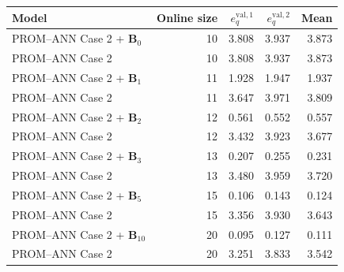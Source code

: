 \begin{tabular}{lr|rrr}
\toprule
Model & Online size & $e_q^{\mathrm{val},1}$ & $e_q^{\mathrm{val},2}$ & Mean \\
\midrule
PROM--ANN Case 2 + $\mathbf B_{0}$ & 10 & 3.808 & 3.937 & 3.873 \\
PROM--ANN Case 2 & 10 & 3.808 & 3.937 & 3.873 \\
\addlinespace[0.2em]
PROM--ANN Case 2 + $\mathbf B_{1}$ & 11 & 1.928 & 1.947 & 1.937 \\
PROM--ANN Case 2 & 11 & 3.647 & 3.971 & 3.809 \\
\addlinespace[0.2em]
PROM--ANN Case 2 + $\mathbf B_{2}$ & 12 & 0.561 & 0.552 & 0.557 \\
PROM--ANN Case 2 & 12 & 3.432 & 3.923 & 3.677 \\
\addlinespace[0.2em]
PROM--ANN Case 2 + $\mathbf B_{3}$ & 13 & 0.207 & 0.255 & 0.231 \\
PROM--ANN Case 2 & 13 & 3.480 & 3.959 & 3.720 \\
\addlinespace[0.2em]
PROM--ANN Case 2 + $\mathbf B_{5}$ & 15 & 0.106 & 0.143 & 0.124 \\
PROM--ANN Case 2 & 15 & 3.356 & 3.930 & 3.643 \\
\addlinespace[0.2em]
PROM--ANN Case 2 + $\mathbf B_{10}$ & 20 & 0.095 & 0.127 & 0.111 \\
PROM--ANN Case 2 & 20 & 3.251 & 3.833 & 3.542 \\
\bottomrule
\end{tabular}
